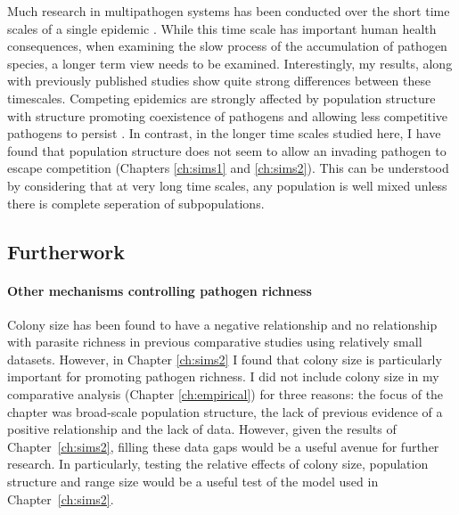 Much research in multipathogen systems has been conducted over the short time scales of a single epidemic \cite{van2014domination, poletto2013host, poletto2015characterising, funk2010interacting}.
While this time scale has important human health consequences, when examining the slow process of the accumulation of pathogen species, a longer term view needs to be examined.
Interestingly, my results, along with previously published studies show quite strong differences between these timescales. 
Competing epidemics are strongly affected by population structure with structure promoting coexistence of pathogens and allowing less competitive pathogens to persist \cite{poletto2013host, poletto2015characterising}.
In contrast, in the longer time scales studied here, I have found that population structure does not seem to allow an invading pathogen to escape competition (Chapters \ref{ch:sims1} and \ref{ch:sims2}).
This can be understood by considering that at very long time scales, any population is well mixed unless there is complete seperation of subpopulations.



\subsection{Furtherwork}

\paragraph{Other mechanisms controlling pathogen richness}

Colony size has been found to have a negative relationship \cite{gay2014parasite} and no relationship \cite{turmelle2009correlates} with parasite richness in previous comparative studies using relatively small datasets.
However, in Chapter \ref{ch:sims2} I found that colony size is particularly important for promoting pathogen richness.
I did not include colony size in my comparative analysis (Chapter \ref{ch:empirical}) for three reasons: the focus of the chapter was broad-scale population structure, the lack of previous evidence of a positive relationship \cite{gay2014parasite, turmelle2009correlates} and the lack of data.
However, given the results of Chapter~\ref{ch:sims2}, filling these data gaps would be a useful avenue for further research.
In particularly, testing the relative effects of colony size, population structure and range size would be a useful test of the model used in Chapter~\ref{ch:sims2}.

